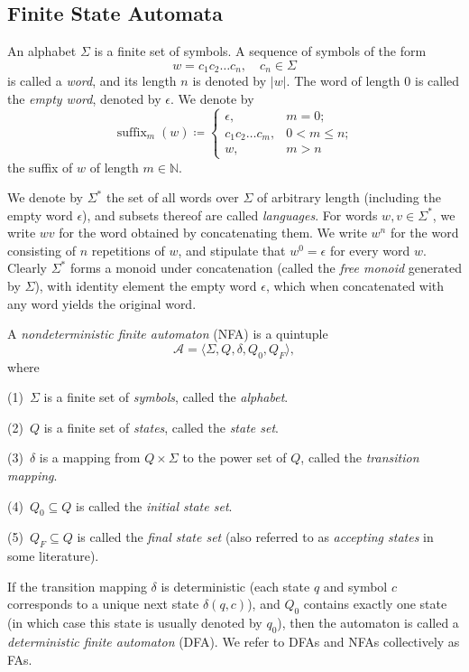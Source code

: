 \documentclass[11pt]{article}
\theoremstyle{definition}
\theoremstyle{plain}
\newcommand{\varA}{\mathcal{A}}
\begin{document}
\subsection{Finite State Automata}

An alphabet $\varSigma$ is a finite set of symbols.
A sequence of symbols of the form
\[
    w=c_1 c_2\ldots c_n, \quad c_n \in\varSigma
\]
is called a \textit{word}, and its length $n$ is denoted by $|w|$.
The word of length $0$ is called the \textit{empty word}, denoted by $\epsilon$.
We denote by
\[
    \operatorname{suffix}_m(w) \coloneq
    \begin{cases}
        \epsilon,           & m=0; \\
        c_1 c_2 \ldots c_m, & 0 < m \leq n; \\
        w,                  & m > n
    \end{cases}
\]
the suffix of $w$ of length $m \in\mathbb{N}$.

We denote by $\varSigma^*$ the set of all words over $\varSigma$ of arbitrary length (including the empty word $\epsilon$), and subsets thereof are called \textit{languages}.
For words $w, v\in\varSigma^*$, we write $wv$ for the word obtained by concatenating them. We write $w^n$ for the word consisting of $n$ repetitions of $w$, and stipulate that $w^0=\epsilon$ for every word $w$.
Clearly $\varSigma^*$ forms a monoid under concatenation (called the \textit{free monoid} generated by $\varSigma$), with identity element the empty word $\epsilon$, which when concatenated with any word yields the original word.

A \textit{nondeterministic finite automaton} (NFA) is a quintuple
\[
    \varA= \langle \varSigma, Q, \delta, Q_0, Q_F \rangle, 
\]
where

(1)~$\varSigma$ is a finite set of \textit{symbols}, called the \textit{alphabet}.

(2)~$Q$ is a finite set of \textit{states}, called the \textit{state set}.

(3)~$\delta$ is a mapping from $Q \times \varSigma$ to the power set of $Q$, called the \textit{transition mapping}.

(4)~$Q_0 \subseteq Q$ is called the \textit{initial state set}.

(5)~$Q_F \subseteq Q$ is called the \textit{final state set} (also referred to as \textit{accepting states} in some literature).

If the transition mapping $\delta$ is deterministic (each state $q$ and symbol $c$ corresponds to a unique next state $\delta(q, c)$),
and $Q_0$ contains exactly one state (in which case this state is usually denoted by $q_0$), then the automaton is called a \textit{deterministic finite automaton} (DFA).
We refer to DFAs and NFAs collectively as FAs.
\end{document}
